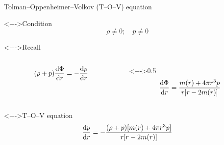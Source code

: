 \documentclass{beamer}
\let\svthefootnote\thefootnote
\newcommand\blankfootnote[1]{%
  \let\thefootnote\relax\footnotetext{#1}%
  \let\thefootnote\svthefootnote%
}
\begin{document}
\begin{frame}{Tolman--Oppenheimer--Volkov (T--O--V) equation}

\begin{block}<+->{Condition}
\begin{displaymath}
  \rho \neq 0; \quad p \neq 0
\end{displaymath}
\end{block}

\begin{block}<+->{Recall}

\begin{columns}[c]
\begin{column}{0.5\textwidth}
\begin{displaymath}
  (\rho + p) \dv{\Phi}{r} = -\dv{p}{r}
\end{displaymath}
\end{column}

\begin{column}<+->{0.5\textwidth}
\begin{displaymath}
  \dv{\Phi}{r} = \frac{m(r) + 4 \pi r^3 p}{r [r - 2 m(r)]}
\end{displaymath}
\end{column}
\end{columns}

\end{block}

\begin{block}<+->{T--O--V equation}
\begin{displaymath}
  \dv{p}{r} =
 -\frac{(\rho + p) [m(r) + 4 \pi r^3 p]}{r [r - 2m(r)]}
\end{displaymath}
\end{block}

\blankfootnote{\textcite[pp. 261--264]{Schutz}}



\end{frame}
\end{document}
